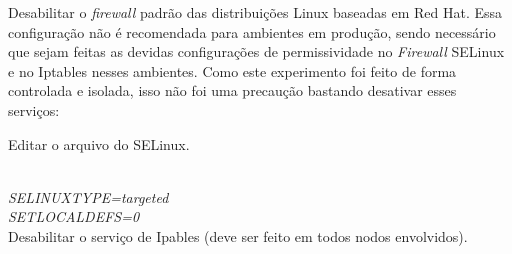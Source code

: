 Desabilitar o \textit{firewall} padrão das distribuições Linux baseadas em Red Hat. 
Essa configuração não é recomendada para ambientes em produção, sendo necessário que sejam feitas 
as devidas configurações de permissividade no \textit{Firewall} SELinux e no Iptables nesses ambientes.
Como este experimento foi feito de forma controlada e isolada, isso não foi uma precaução 
bastando desativar esses serviços:

Editar o arquivo do SELinux.


 \\
\textit{SELINUXTYPE=targeted} \\
\textit{SETLOCALDEFS=0} \\

Desabilitar o serviço de Ipables (deve ser feito em todos nodos envolvidos).

